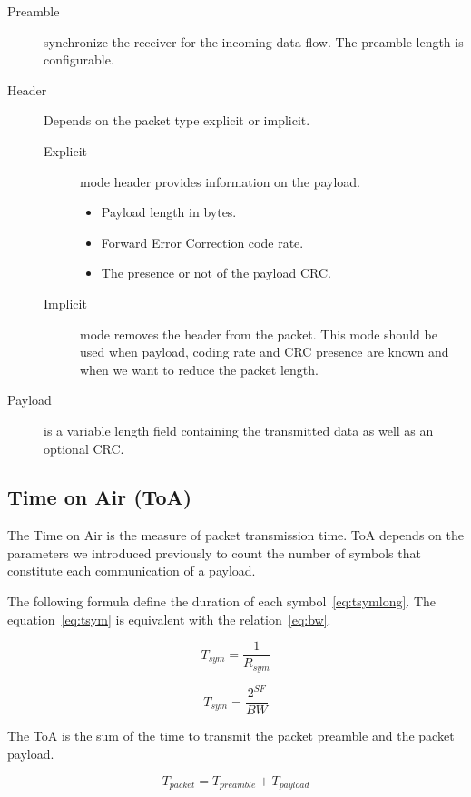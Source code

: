 \begin{description}
  \item[Preamble] synchronize the receiver for the incoming data flow. The
    preamble length is configurable.
  \item[Header] Depends on the packet type explicit or implicit.
  \begin{description}
    \item[Explicit] mode header provides information on the payload.
    \begin{itemize}
      \item Payload length in bytes.
      \item Forward Error Correction code rate.
      \item The presence or not of the payload CRC.
    \end{itemize}
    \item[Implicit] mode removes the header from the packet. This mode should be
      used when payload, coding rate and CRC presence are known and when we want to
      reduce the packet length.
  \end{description}
  \item[Payload] is a variable length field containing the transmitted data as
    well as an optional CRC.
\end{description}

\subsection{Time on Air (ToA)}

The Time on Air is the measure of packet transmission time.
ToA depends on the parameters we introduced previously to count the number of
symbols that constitute each communication of a payload.

The following formula define the duration of each symbol~\ref{eq:tsymlong}.
The equation~\ref{eq:tsym} is equivalent with the relation~\ref{eq:bw}.

\begin{equation}
  \label{eq:tsymlong}
  T_{sym} = \frac{1}{R_{sym}}
\end{equation}

\begin{equation}
  \label{eq:tsym}
  T_{sym} = \frac{2^{SF}}{BW}
\end{equation}

The ToA is the sum of the time to transmit the packet preamble and the packet
payload.

\begin{equation}
  \label{eq:tpacket}
  T_{packet} = T_{preamble} + T_{payload}
\end{equation}

